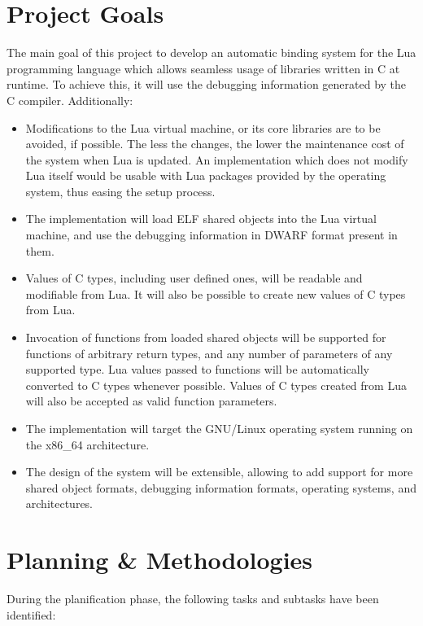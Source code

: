 \section{Project Goals}

The main goal of this project to develop an automatic binding system for the
Lua programming language which allows seamless usage of libraries written in
C at runtime. To achieve this, it will use the debugging information generated
by the C compiler. Additionally:

\begin{itemize}
	\item Modifications to the Lua virtual machine, or its core libraries are
		to be avoided, if possible. The less the changes, the lower the
		maintenance cost of the system when Lua is updated. An implementation
		which does not modify Lua itself would be usable with Lua packages
		provided by the operating system, thus easing the setup process.
	\item The implementation will load \gls{ELF} shared objects
		into the Lua virtual machine, and use the debugging information in
		\gls{DWARF} format present in them.
	\item Values of C types, including user defined ones, will be readable
		and modifiable from Lua. It will also be possible to create new
		values of C types from Lua.
	\item Invocation of functions from loaded shared objects will be supported
		for functions of arbitrary return types, and any number of
		parameters of any supported type. Lua values passed to functions
		will be automatically converted to C types whenever possible. Values
		of C types created from Lua will also be accepted as valid function
		parameters.
	\item The implementation will target the GNU/Linux operating system
		running on the x86\_64 architecture.
	\item The design of the system will be extensible, allowing to add
		support for more shared object formats, debugging information formats,
		operating systems, and architectures.
\end{itemize}


\section{Planning \& Methodologies}

During the planification phase, the following tasks and subtasks have been
identified:

